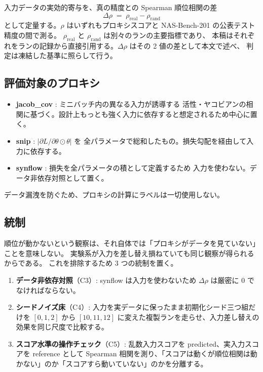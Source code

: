 \documentclass[11pt]{article}
\begin{document}
入力データの実効的寄与を、真の精度との Spearman 順位相関の差
\begin{equation}
\Delta\rho \;=\; \rho_{\mathrm{real}} - \rho_{\mathrm{rand}}
\end{equation}
として定量する。$\rho$ はいずれもプロキシスコアと NAS-Bench-201 の公表テスト精度の間で測る。
$\rho_{\mathrm{real}}$ と $\rho_{\mathrm{rand}}$ は別々のランの主要指標であり、
本稿はそれぞれをランの記録から直接引用する。$\Delta\rho$ はその 2 値の差として本文で述べ、
判定は凍結した基準に照らして行う。

\subsection{評価対象のプロキシ}

\begin{itemize}
\item \textbf{jacob\_cov} \cite{mellor2021naswot}: ミニバッチ内の異なる入力が誘導する
活性・ヤコビアンの相関に基づく。設計上もっとも強く入力に依存すると想定されるため中心に置く。
\item \textbf{snip} \cite{lee2019snip}: $|\partial L/\partial\theta \odot \theta|$ を
全パラメータで総和したもの。損失勾配を経由して入力に依存する。
\item \textbf{synflow} \cite{tanaka2020synflow}: 損失を全パラメータの積として定義するため
入力を使わない。データ非依存対照として置く。
\end{itemize}

データ漏洩を防ぐため、プロキシの計算にラベルは一切使用しない。

\subsection{統制}

順位が動かないという観察は、それ自体では「プロキシがデータを見ていない」ことを意味しない。
実験系が入力を差し替え損ねていても同じ観察が得られるからである。
これを排除するため 3 つの統制を置く。

\begin{enumerate}
\item \textbf{データ非依存対照}（C3）: synflow は入力を使わないため $\Delta\rho$ は厳密に $0$ でなければならない。
\item \textbf{シードノイズ床}（C4）: 入力を実データに保ったまま初期化シード三つ組だけを
$[0,1,2]$ から $[10,11,12]$ に変えた複製ランを走らせ、入力差し替えの効果を同じ尺度で比較する。
\item \textbf{スコア水準の操作チェック}（C5）: 乱数入力スコアを predicted、実入力スコアを reference として
Spearman 相関を測り、「スコアは動くが順位相関は動かない」のか「スコアすら動いていない」のかを分離する。
\end{enumerate}
\end{document}
